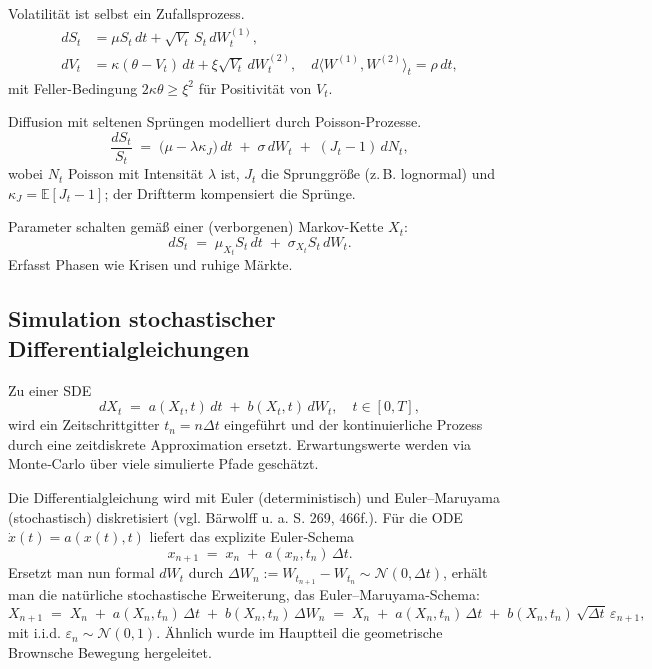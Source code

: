 \begin{bsp}
Volatilität ist selbst ein Zufallsprozess.
$$
\begin{aligned}
dS_t &= \mu S_t\,dt + \sqrt{V_t}\,S_t\,dW_t^{(1)},\\
dV_t &= \kappa(\theta - V_t)\,dt + \xi\sqrt{V_t}\,dW_t^{(2)},\quad d \langle W^{(1)},W^{(2)}\rangle_t=\rho\,dt,
\end{aligned}
$$
mit Feller-Bedingung $2\kappa\theta\ge \xi^2$ für Positivität von $V_t$.
\end{bsp}

\begin{bsp}
Diffusion mit seltenen Sprüngen modelliert durch Poisson-Prozesse.
$$
\frac{dS_t}{S_t} \;=\; \big(\mu - \lambda \kappa_J\big)\,dt \;+\; \sigma\,dW_t \;+\; (J_t-1)\,dN_t,
$$
wobei $N_t$ Poisson mit Intensität $\lambda$ ist, $J_t$ die Sprunggröße (z.\,B. lognormal) und $\kappa_J=\mathbb E[J_t-1]$; der Driftterm kompensiert die Sprünge.
\end{bsp}

\begin{bsp}
Parameter schalten gemäß einer (verborgenen) Markov-Kette $X_t$:
$$
dS_t \;=\; \mu_{X_t} S_t\,dt \;+\; \sigma_{X_t} S_t\,dW_t.
$$
Erfasst Phasen wie Krisen und ruhige Märkte.
\end{bsp}

\subsection{Simulation stochastischer Differentialgleichungen}
Zu einer SDE
$$
dX_t \;=\; a(X_t,t)\,dt \;+\; b(X_t,t)\,dW_t,\quad t\in[0,T],
$$
wird ein Zeitschrittgitter $t_n=n\Delta t$ eingeführt und der kontinuierliche Prozess durch eine zeitdiskrete Approximation ersetzt. Erwartungswerte werden via Monte‑Carlo über viele simulierte Pfade geschätzt.

Die Differentialgleichung wird mit Euler (deterministisch) und Euler–Maruyama (stochastisch) diskretisiert (vgl. Bärwolff \cite{Baerwolff2025} u. a. S. 269, 466f.).
Für die ODE $\dot x(t)=a(x(t),t)$ liefert das explizite Euler‑Schema
$$
x_{n+1} \;=\; x_n \;+\; a(x_n,t_n)\,\Delta t.
$$
Ersetzt man nun formal $dW_t$ durch $\Delta W_n:=W_{t_{n+1}}-W_{t_n}\sim \mathcal N(0,\Delta t)$, erhält man die natürliche stochastische Erweiterung, das Euler–Maruyama‑Schema:
$$
X_{n+1} \;=\; X_n \;+\; a(X_n,t_n)\,\Delta t \;+\; b(X_n,t_n)\,\Delta W_n
\;=\; X_n \;+\; a(X_n,t_n)\,\Delta t \;+\; b(X_n,t_n)\,\sqrt{\Delta t}\,\varepsilon_{n+1},
$$
mit i.i.d. $\varepsilon_{n}\sim\mathcal N(0,1)$. 
Ähnlich wurde im Hauptteil die geometrische Brownsche Bewegung hergeleitet.

